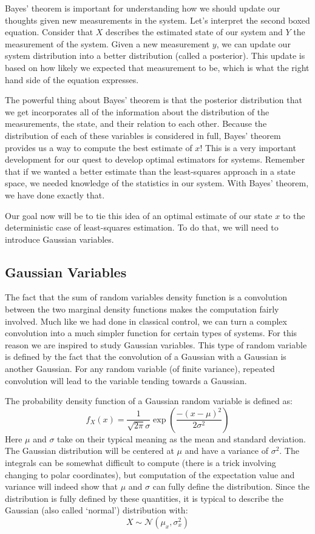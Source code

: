 
Bayes' theorem is important for understanding how we should update our thoughts given new measurements in the system. Let's interpret the second boxed equation. Consider that $X$ describes the estimated state of our system and $Y$ the measurement of the system. Given a new measurement $y$, we can update our system distribution into a better distribution (called a posterior). This update is based on how likely we expected that measurement to be, which is what the right hand side of the equation expresses.

The powerful thing about Bayes' theorem is that the posterior distribution that we get incorporates all of the information about the distribution of the measurements, the state, and their relation to each other. Because the distribution of each of these variables is considered in full, Bayes' theorem provides us a way to compute the best estimate of $x$! This is a very important development for our quest to develop optimal estimators for systems. Remember that if we wanted a better estimate than the least-squares approach in a state space, we needed knowledge of the statistics in our system. With Bayes' theorem, we have done exactly that.

Our goal now will be to tie this idea of an optimal estimate of our state $x$ to the deterministic case of least-squares estimation. To do that, we will need to introduce Gaussian variables.

\subsection{Gaussian Variables}

The fact that the sum of random variables density function is a convolution between the two marginal density functions makes the computation fairly involved. Much like we had done in classical control, we can turn a complex convolution into a much simpler function for certain types of systems. For this reason we are inspired to study Gaussian variables. This type of random variable is defined by the fact that the convolution of a Gaussian with a Gaussian is another Gaussian. For any random variable (of finite variance), repeated convolution will lead to the variable tending towards a Gaussian.

The probability density function of a Gaussian random variable is defined as:
$$f_X(x)=\frac{1}{\sqrt{2\pi}\sigma}\exp\left(\frac{-(x-\mu)^2}{2\sigma^2}\right)$$
Here $\mu$ and $\sigma$ take on their typical meaning as the mean and standard deviation. The Gaussian distribution will be centered at $\mu$ and have a variance of $\sigma^2$. The integrals can be somewhat difficult to compute (there is a trick involving changing to polar coordinates), but computation of the expectation value and variance will indeed show that $\mu$ and $\sigma$ can fully define the distribution. Since the distribution is fully defined by these quantities, it is typical to describe the Gaussian (also called `normal') distribution with:
$$X\sim\mathcal{N}(\mu_x,\sigma_x^2)$$

